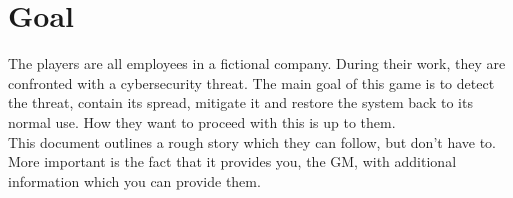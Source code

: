 \chapter{Goal}

The players are all employees in a fictional company.
During their work, they are confronted with a cybersecurity threat.
The main goal of this game is to detect the threat, contain its spread, mitigate it and restore the system back to its normal use. 
How they want to proceed with this is up to them.
\\

This document outlines a rough story which they can follow, but don't have to.
More important is the fact that it provides you, the GM, with additional information which you can provide them.